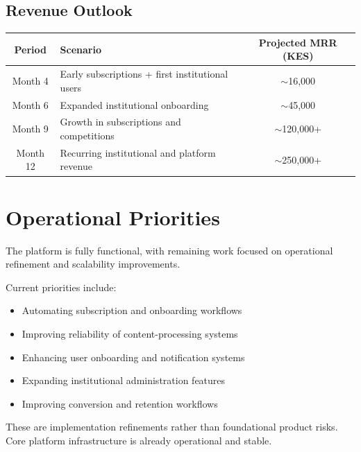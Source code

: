 \documentclass[a4paper,11pt]{article}
\begin{document}
\subsection*{Revenue Outlook}

\begin{table}[h]
\centering
\begin{tabular}{@{}c p{6cm} c@{}}
\toprule
\rowcolor{indigobg}
\textcolor{indigobrand}{\textbf{Period}} &
\textcolor{indigobrand}{\textbf{Scenario}} &
\textcolor{indigobrand}{\textbf{Projected MRR (KES)}} \\
\midrule
Month 4  & Early subscriptions + first institutional users & $\sim$16,000 \\
Month 6  & Expanded institutional onboarding               & $\sim$45,000 \\
Month 9  & Growth in subscriptions and competitions        & $\sim$120,000+ \\
Month 12 & Recurring institutional and platform revenue    & $\sim$250,000+ \\
\bottomrule
\end{tabular}
\end{table}

\section{Operational Priorities}

The platform is fully functional, with remaining work focused on operational refinement and scalability improvements.

Current priorities include:

\begin{itemize}[nosep]
    \item Automating subscription and onboarding workflows
    \item Improving reliability of content-processing systems
    \item Enhancing user onboarding and notification systems
    \item Expanding institutional administration features
    \item Improving conversion and retention workflows
\end{itemize}

These are implementation refinements rather than foundational product risks. Core platform infrastructure is already operational and stable.

\end{document}
